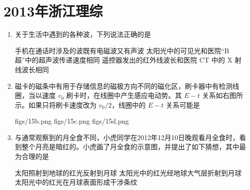 \documentclass[\gkver]{gaokaozhenti}
\begin{document}
\chapter{2013年浙江理综}

\begin{enumerate}
\item
关于生活中遇到的各种波，下列说法正确的是

{手机在通话时涉及的波既有电磁波又有声波}
{太阳光中的可见光和医院“B 超”中的超声波传递速度相同}
{遥控器发出的红外线波长和医院 CT 中的 X 射线波长相同}


\item
磁卡的磁条中有用于存储信息的磁极方向不同的磁化区，刷卡器中有检测线圈，当以速度 $v_{0}$ 刷卡时，在线圈中产生感应电动势。其 $E-t$ 关系如右图所示。如果只将刷卡速度改为 $v_{0}/2$，线圈中的 $E-t$ 关系可能是


{figs/15b.png}
{figs/15c.png}
{figs/15d.png}


\item
与通常观察到的月全食不同，小虎同学在2012年12月10日晚观看月全食时，看到整个月亮是暗红的。小虎画了月全食的示意图，并提出了如下猜想，其中最为合理的是


{太阳照射到地球的红光反射到月球}
{太阳光中的红光经地球大气层折射到月球}
{太阳光中的红光在月球表面形成干涉条纹}


\end{enumerate}
\end{document}
